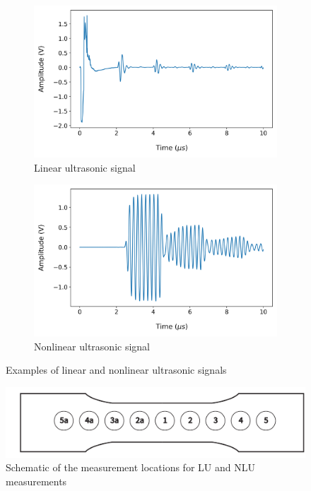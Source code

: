\begin{figure}[tb]
  \centering
  \begin{subfigure}[t]{0.49\linewidth}
    \includegraphics[width=\textwidth]{fig/lu_signal_raw.png}
    \caption{Linear ultrasonic signal}
    \label{fig: lu signal raw}
  \end{subfigure}
  \begin{subfigure}[t]{0.49\linewidth}
    \includegraphics[width=\textwidth]{fig/nlu_singal_raw.png}
    \caption{Nonlinear ultrasonic signal}
    \label{fig: nlu signal raw}
  \end{subfigure}

  \caption{Examples of linear and nonlinear ultrasonic signals}
  \label{fig: lu and nlu signals raw}
\end{figure}

\begin{figure}[tb]
  \centering
  \includegraphics[width=0.6\linewidth]{fig/specimen_measurment_locs.pdf}
  \caption{Schematic of the measurement locations for LU and NLU measurements}
  \label{fig: measurement locations}
\end{figure}

